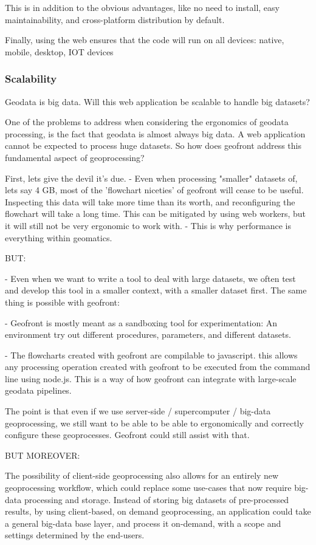 This is in addition to the obvious advantages, like no need to install, easy maintainability, and cross-platform distribution by default.

Finally, using the web ensures that the code will run on all devices: native, mobile, desktop, IOT devices

\subsubsection{Scalability}

Geodata is big data. Will this web application be scalable to handle big datasets?

One of the problems to address when considering the ergonomics of geodata processing, is the fact that geodata is almost always big data. A web application cannot be expected to process huge datasets. So how does geofront address this fundamental aspect of geoprocessing? 

First, lets give the devil it's due. 
- Even when processing "smaller" datasets of, lets say 4 GB, most of the 'flowchart niceties' of geofront will cease to be useful. Inspecting this data will take more time than its worth, and reconfiguring the flowchart will take a long time. This can be mitigated by using web workers, but it will still not be very ergonomic to work with. 
- This is why performance is everything within geomatics.

BUT: 

- Even when we want to write a tool to deal with large datasets, we often test and develop this tool in a smaller context, with a smaller dataset first. The same thing is possible with geofront: 

- Geofront is mostly meant as a sandboxing tool for experimentation: An environment try out different procedures, parameters, and different datasets. 

- The flowcharts created with geofront are compilable to javascript. this allows any processing operation created with geofront to be executed from the command line using node.js. This is a way of how geofront can integrate with large-scale geodata pipelines. 

The point is that even if we use server-side / supercomputer / big-data geoprocessing, we still want to be able to be able to ergonomically and correctly configure these geoprocesses. Geofront could still assist with that.

BUT MOREOVER:

The possibility of client-side geoprocessing also allows for an entirely new geoprocessing workflow, which could replace some use-cases that now require big-data processing and storage. Instead of storing big datasets of pre-processed results, by using client-based, on demand geoprocessing, an application could take a general big-data base layer, and process it on-demand, with a scope and settings determined by the end-users. 

